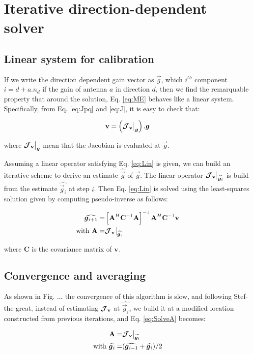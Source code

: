 \section{Iterative direction-dependent solver}

\subsection{Linear system for calibration}

If we write the
direction dependent gain vector as $\vec{g}$, which $i^{th}$ component
$i=d+a.n_d$ if the gain of antenna $a$ in direction $d$, then we find
the remarquable property that around the solution, Eq. \ref{eq:ME}
behaves like a linear system. Specifically, from Eq. \ref{eq:Jpq} and
\ref{eq:J}, it is easy to check that:

\begin{alignat}{2}
\label{eq:Lin}
\mathbf{v}=\left(\JV\big|_{\vec{g}}\right).\vec{g}
\end{alignat}

\noindent where $\JV\big|_{\vec{g}}$ mean that the Jacobian is
evaluated at $\vec{g}$.

Assuming a linear operator satisfying
Eq. \ref{eq:Lin} is given, we can build an iterative scheme to
derive an estimate $\widehat{\vec{g}}$ of $\vec{g}$. The linear operator
$\JV\big|_{\widehat{\vec{g}_i}}$ is build from the estimate
$\widehat{\vec{g}_i}$ at step $i$. Then Eq. \ref{eq:Lin} is solved
using the least-squares solution given by computing pseudo-inverse as follows:

\def\A{\textbf{A}}

\begin{alignat}{2}
\label{eq:Solve}
\widehat{\vec{g}_{i+1}}=&\left[\A^H\textbf{C}^{-1}\A\right]^{-1}\A^H\textbf{C}^{-1}\mathbf{v}\\
\label{eq:SolveA}
\text{with } \A=&\JV\big|_{\widehat{\vec{g}_i}}
\end{alignat}

\noindent where \textbf{C} is the covariance matrix of $\mathbf{v}$.


\subsection{Convergence and averaging}

As shown in Fig. ... the convergence of this algorithm is slow, and
following Stef-the-great, instead of estimating $\bm{\mathcal{J}}_{\textbf{v}}$ at
$\widehat{\vec{g}_i}$, we build it at a modified location constructed
from previous iterations, and Eq. \ref{eq:SolveA} becomes:

\begin{alignat}{2}
\A=&\JV\big|_{\widetilde{\vec{g}_i}}\\
\text{with } \widetilde{\vec{g}_i}=&(\widehat{\vec{g}_{i-1}}+\widehat{\vec{g}_{i}})/2
\end{alignat}


